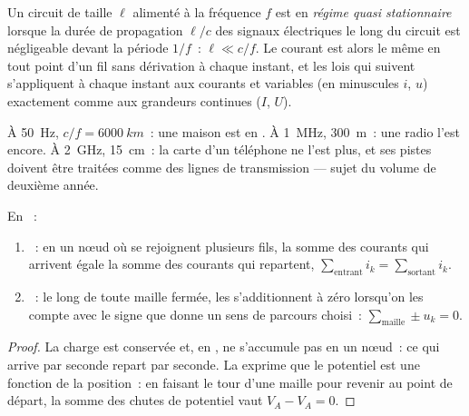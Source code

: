 \begin{definition}\label{def:b1:dc-circuits:arqs}
Un circuit de taille $\ell$ alimenté à la fréquence $f$ est en
\emph{régime quasi stationnaire} lorsque la durée de propagation
$\ell/c$ des signaux électriques le long du circuit est négligeable
devant la période $1/f$~: $\ell \ll c/f$. Le courant est alors le même
en tout point d'un fil sans dérivation à chaque instant, et les lois qui
suivent s'appliquent à chaque instant aux courants et  variables
(en minuscules $i$, $u$) exactement comme aux grandeurs continues
($I$, $U$).
\end{definition}

\begin{example}\label{ex:b1:dc-circuits:arqs}
À \qty{50}{Hz}, $c/f = \qty{6000}{km}$~: une maison est en . À \qty{1}{MHz}, \qty{300}{m}~: une radio l'est encore. À
\qty{2}{GHz}, \qty{15}{cm}~: la carte d'un téléphone ne l'est plus, et
ses pistes doivent être traitées comme des lignes de transmission ---
sujet du volume de deuxième année.
\end{example}

\begin{theorem}\label{thm:b1:dc-circuits:kirchhoff}
En ~:
\begin{enumerate}
  \item \emph{}~: en un nœud où se rejoignent plusieurs
        fils, la somme des courants qui arrivent égale la somme des
        courants qui repartent,
        $\sum_{\text{entrant}} i_k = \sum_{\text{sortant}} i_k$.
  \item \emph{}~: le long de toute maille fermée, les
         s'additionnent à zéro lorsqu'on les compte avec le signe
        que donne un sens de parcours choisi~: $\sum_{\text{maille}} \pm u_k = 0$.
\end{enumerate}
\end{theorem}

\begin{proof}
La charge est conservée et, en , ne s'accumule
pas en un nœud~: ce qui arrive par seconde repart par seconde. La  exprime que le potentiel est une fonction de la position~:
en faisant le tour d'une maille pour revenir au point de départ, la
somme des chutes de potentiel vaut $V_A - V_A = 0$.
\end{proof}

